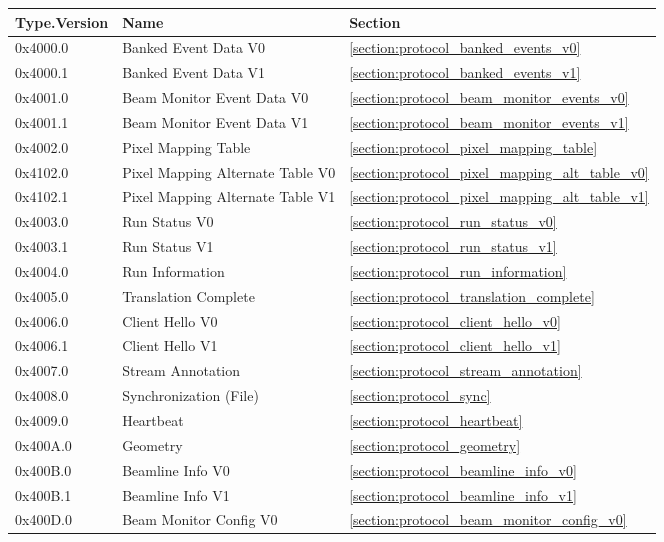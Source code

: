 \begin{table}
  \begin{center}
    \begin{tabular}{l | l | l}
	Type.Version & Name & Section \\
	\hline
	0x4000.0 & Banked Event Data V0 &
		\ref{section:protocol_banked_events_v0} \\
	0x4000.1 & Banked Event Data V1 &
		\ref{section:protocol_banked_events_v1} \\
	0x4001.0 & Beam Monitor Event Data V0 &
		\ref{section:protocol_beam_monitor_events_v0} \\
	0x4001.1 & Beam Monitor Event Data V1 &
		\ref{section:protocol_beam_monitor_events_v1} \\
	0x4002.0 & Pixel Mapping Table &
		\ref{section:protocol_pixel_mapping_table} \\
	0x4102.0 & Pixel Mapping Alternate Table V0 &
		\ref{section:protocol_pixel_mapping_alt_table_v0} \\
	0x4102.1 & Pixel Mapping Alternate Table V1 &
		\ref{section:protocol_pixel_mapping_alt_table_v1} \\
	0x4003.0 & Run Status V0 &
		\ref{section:protocol_run_status_v0} \\
	0x4003.1 & Run Status V1 &
		\ref{section:protocol_run_status_v1} \\
	0x4004.0 & Run Information &
		\ref{section:protocol_run_information} \\
	0x4005.0 & Translation Complete &
		\ref{section:protocol_translation_complete} \\
	0x4006.0 & Client Hello V0 &
		\ref{section:protocol_client_hello_v0} \\
	0x4006.1 & Client Hello V1 &
		\ref{section:protocol_client_hello_v1} \\
	0x4007.0 & Stream Annotation &
		\ref{section:protocol_stream_annotation} \\
	0x4008.0 & Synchronization (File) &
		\ref{section:protocol_sync} \\
	0x4009.0 & Heartbeat &
		\ref{section:protocol_heartbeat} \\
	0x400A.0 & Geometry &
		\ref{section:protocol_geometry} \\
	0x400B.0 & Beamline Info V0 &
		\ref{section:protocol_beamline_info_v0} \\
	0x400B.1 & Beamline Info V1 &
		\ref{section:protocol_beamline_info_v1} \\
	0x400D.0 & Beam Monitor Config V0 &
		\ref{section:protocol_beam_monitor_config_v0} \\

\end{tabular}
\end{center}
\end{table}
